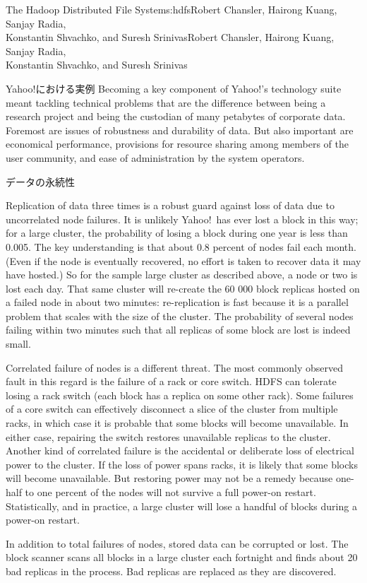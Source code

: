 \begin{aosachaptertoc}{The Hadoop Distributed File System}{s:hdfs}{Robert Chansler, Hairong Kuang, Sanjay Radia, \\ Konstantin Shvachko, and Suresh Srinivas}{Robert Chansler, Hairong Kuang, Sanjay Radia, \\ \hspace*{0.9cm} Konstantin Shvachko, and Suresh Srinivas}
\begin{aosasect1}{Yahoo!における実例}
Becoming a key component of Yahoo!'s technology suite meant tackling
technical problems that are the difference between being a research
project and being the custodian of many petabytes of corporate data.
Foremost are issues of robustness and durability of data. But also
important are economical performance, provisions for resource sharing
among members of the user community, and ease of administration by the
system operators.

\begin{aosasect2}{データの永続性}

Replication of data three times is a robust guard against loss of data
due to uncorrelated node failures. It is unlikely Yahoo!\ has ever lost
a block in this way; for a large cluster, the probability of losing a
block during one year is less than 0.005. The key understanding is
that about 0.8 percent of nodes fail each month. (Even if the node is
eventually recovered, no effort is taken to recover data it may have
hosted.) So for the sample large cluster as described above, a node or
two is lost each day. That same cluster will re-create the 60 000
block replicas hosted on a failed node in about two
minutes: re-replication is fast because it is a parallel problem that
scales with the size of the cluster. The probability of several nodes
failing within two minutes such that all replicas of some block are
lost is indeed small.

Correlated failure of nodes is a different threat. The most commonly
observed fault in this regard is the failure of a rack or core switch.
HDFS can tolerate losing a rack switch (each block has a replica on
some other rack). Some failures of a core switch can effectively
disconnect a slice of the cluster from multiple racks, in which case
it is probable that some blocks will become unavailable. In either
case, repairing the switch restores unavailable replicas to the
cluster. Another kind of correlated failure is the accidental or
deliberate loss of electrical power to the cluster. If the loss of
power spans racks, it is likely that some blocks will become
unavailable. But restoring power may not be a remedy because one-half
to one percent of the nodes will not survive a full power-on restart.
Statistically, and in practice, a large cluster will lose a handful of
blocks during a power-on restart.

In addition to total failures of nodes, stored data can be corrupted
or lost. The block scanner scans all blocks in a large cluster each
fortnight and finds about 20 bad replicas in the process. Bad replicas
are replaced as they are discovered.


\end{aosasect2}
\end{aosasect1}
\end{aosachaptertoc}
